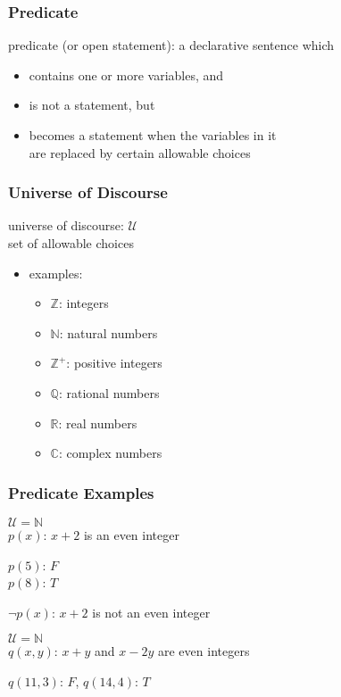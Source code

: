 \documentclass[dvipsnames]{beamer}
\begin{document}
\begin{frame}
  \frametitle{Predicate}

  \begin{definition}
    \alert{predicate} (or \alert{open statement}): a declarative sentence which
    \begin{itemize}
      \item contains one or more variables, and
      \item is not a statement, but
      \item becomes a statement when the variables in it\\
        are replaced by certain allowable choices
    \end{itemize}
  \end{definition}
\end{frame}

\begin{frame}
  \frametitle{Universe of Discourse}

  \begin{definition}
    \alert{universe of discourse}: $\mathcal{U}$\\
    set of allowable choices
  \end{definition}

  \pause
  \begin{itemize}
    \item examples:
    \begin{itemize}
      \item $\mathbb{Z}$: integers
      \item $\mathbb{N}$: natural numbers
      \item $\mathbb{Z}^+$: positive integers
      \item $\mathbb{Q}$: rational numbers
      \item $\mathbb{R}$: real numbers
      \item $\mathbb{C}$: complex numbers
    \end{itemize}
  \end{itemize}
\end{frame}

\begin{frame}
  \frametitle{Predicate Examples}

  \begin{example}
    $\mathcal{U} = \mathbb{N}$\\
    $p(x)$: $x+2$ is an even integer

    \bigskip
    $p(5)$: $F$\\
    $p(8)$: $T$

    \pause
    \bigskip
    $\neg p(x)$: $x+2$ is not an even integer
  \end{example}

  \pause
  \begin{example}
    $\mathcal{U} = \mathbb{N}$\\
    $q(x,y)$: $x+y$ and $x-2y$ are even integers

    \bigskip
    $q(11,3)$: $F$, $q(14,4)$: $T$
  \end{example}
\end{frame}
\end{document}
